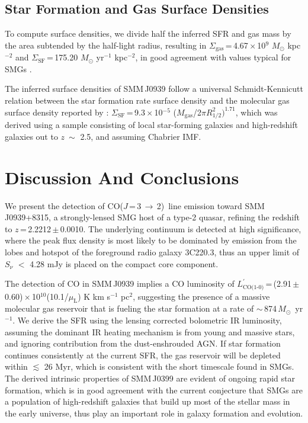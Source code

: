 \documentclass[twocolumn,apj,numberedappendix]{emulateapj}
\newcommand{\Msun}{\mbox{$M_{\odot}$}}
\newcommand{\CO}{\mbox{CO($J$\,=\,3\,$\rightarrow$\,2) }}
\newcommand{\Lp}{\mbox{$L^{\prime}_\textrm{CO(1-0)}$}}
\newcommand{\LpU}{\mbox{K\,\,km\,\,s$^{-1}$\,\,pc$^2$}}
\newcommand{\pmOne}{\mbox{$^{-1}$}}
\begin{document}
\subsection{Star Formation and Gas Surface Densities}
To compute surface densities, we divide half the inferred SFR and gas mass by the area subtended by the half-light 
radius, resulting in $\Sigma_\textrm{gas}$\,=\,4.67\,$\times$\,10$^9$\,\,\Msun\,\,kpc$^{-2}$ and $\Sigma_\textrm{SF}$\,=\,175.20\,\,\Msun\,\,yr\pmOne\,\,kpc$^{-2}$, in good agreement with values typical for SMGs \citep{Tacconi08a}. 

The inferred surface densities of SMM\,J0939 follow a universal Schmidt-Kennicutt relation between the star formation rate
surface density and the molecular gas surface density reported by \citet{B07a}: $\Sigma_\textrm{SF}$\,=\,9.3\,$\times$\,10$^{-5}$ ($M_\textrm{gas}$/2$\pi R_\textrm{1/2}^2)^{1.71}$, which was derived using a sample consisting of local star-forming galaxies and high-redshift 
galaxies
out to $z\ \sim$ 2.5, and assuming Chabrier IMF. 

\section{Discussion And Conclusions} 
We present the detection of \CO line emission toward SMM\,J0939+8315, a strongly-lensed SMG host of a type-2 quasar, refining the redshift  
to $z$\,=\,2.2212\,$\pm$\,0.0010. The underlying continuum is detected at high significance, where the peak flux density is most likely to be 
dominated by emission from the lobes and hotspot of the foreground radio galaxy 3C220.3, thus an upper limit of $S_\nu$ $<$ 4.28 mJy is 
placed on the compact core component. 

The detection of CO in SMM\,J0939 
implies a CO luminosity of \Lp\,=\,(2.91\,$\pm$\,0.60)\,$\times$\,10$^{10}$(10.1/$\mu_\textrm{L}$)\,\,\LpU, suggesting the presence of a massive 
molecular gas reservoir that is fueling the star formation at a rate of $\sim$\,874\,\Msun\ yr\pmOne. We derive the SFR using the lensing 
corrected bolometric IR luminosity, assuming the dominant IR heating mechanism is from young and massive stars, and ignoring contribution from the 
dust-enshrouded AGN. If star formation continues consistently at the current SFR, the gas reservoir will be depleted within $\lesssim$ 26 Myr, 
which is consistent with the short timescale found in SMGs. The derived intrinsic properties of SMM\,J0399 are evident of ongoing rapid star formation, which is in good agreement with the current conjecture that SMGs are a 
population of high-redshift galaxies that build up most of the stellar mass in the early universe, thus play an important role 
in galaxy formation and evolution. 
\end{document}
